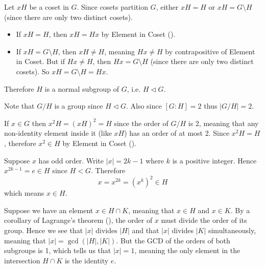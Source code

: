 \begin{questions}
    \item \begin{partquestions}{\roman*}
        \item Let $xH$ be a coset in $G$. Since cosets partition $G$, either $xH = H$ or $xH = G \setminus H$ (since there are only two distinct cosets).
        \begin{itemize}
                \item If $xH = H$, then $xH = Hx$ by Element in Coset ().
                \item If $xH = G \setminus H$, then $xH \neq H$, meaning $Hx \neq H$ by contrapositive of Element in Coset. But if $Hx \neq H$, then $Hx = G \setminus H$ (since there are only two distinct cosets). So $xH = G \setminus H = Hx$.
        \end{itemize}
        Therefore $H$ is a normal subgroup of $G$, i.e. $H \lhd G$.

        \item Note that $G/H$ is a group since $H \lhd G$. Also since $[G:H] = 2$ thus $|G/H| = 2$.

        If $x \in G$ then $x^2H = (xH)^2 = H$ since the order of $G/H$ is 2, meaning that any non-identity element inside it (like $xH$) has an order of at most 2. Since $x^2H = H$, therefore $x^2 \in H$ by Element in Coset ().

        \item Suppose $x$ has odd order. Write $|x| = 2k - 1$ where $k$ is a positive integer. Hence $x^{2k-1} = e \in H$ since $H < G$. Therefore
        \[
            x = x^{2k} = \left(x^k\right)^2 \in H
        \]
        which means $x \in H$.
    \end{partquestions}

    \item \begin{partquestions}{\alph*}
        \item Suppose we have an element $x \in H \cap K$, meaning that $x \in H$ and $x \in K$. By a corollary of Lagrange's theorem (), the order of $x$ must divide the order of its group. Hence we see that $|x|$ divides $|H|$ and that $|x|$ divides $|K|$ simultaneously, meaning that $|x| = \gcd(|H|, |K|)$. But the GCD of the orders of both subgroups is 1, which tells us that $|x| = 1$, meaning the only element in the intersection $H \cap K$ is the identity $e$.


\end{partquestions}
\end{questions}
